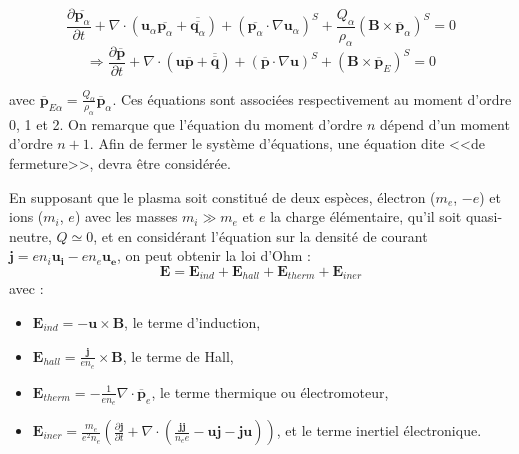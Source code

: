 \begin{equation}
\frac{\partial \overline{\mathbf{p}_{\alpha}}}{\partial t} + \nabla \cdot (\mathbf{u}_{\alpha}\overline{\mathbf{p}_{\alpha}} + \overline{\overline{\mathbf{q}_{\alpha}}}) + (\overline{\mathbf{p}_{\alpha}} \cdot \nabla \mathbf{u}_{\alpha})^S + \frac{Q_{\alpha}}{\rho_{\alpha}} (\mathbf{B}\times \overline{\mathbf{p}}_{\alpha})^S  = 0 \label{eq:model_2} 
\end{equation}
\begin{equation}
\Rightarrow \frac{\partial \overline{\mathbf{p}}}{\partial t} + \nabla \cdot (\mathbf{u}\overline{\mathbf{p}} + \overline{\overline{\mathbf{q}}}) + (\overline{\mathbf{p}} \cdot \nabla \mathbf{u})^S +  (\mathbf{B}\times \overline{\mathbf{p}}_E)^S  = 0 \label{eq:model_2} 
\end{equation}

avec $\overline{\mathbf{p}}_{E\alpha} = \frac{Q_{\alpha}}{\rho_{\alpha}} \overline{\mathbf{p}}_{\alpha}$. Ces équations sont associées respectivement au moment d'ordre 0, 1 et 2. On remarque que l'équation du moment d'ordre $n$ dépend d'un moment d'ordre $n+1$. Afin de fermer le système d'équations, une équation dite <<de fermeture>>, devra être considérée. 

En supposant que le plasma soit constitué de deux espèces, électron ($m_e$, $-e$) et ions ($m_i$, $e$) avec les masses $m_i \gg m_e$ et $e$ la charge élémentaire, qu'il soit quasi-neutre, $Q \simeq 0$, et en considérant l'équation sur la densité de courant $\mathbf{j} = e n_i \mathbf{u_i} - e n_e \mathbf{u_e}$, on peut obtenir la loi d'Ohm : 
\begin{equation} 
\mathbf{E} =  \mathbf{E}_{ind} +  \mathbf{E}_{hall} +  \mathbf{E}_{therm} +  \mathbf{E}_{iner} 
\end{equation}
avec :
\begin{itemize}
 \item $\mathbf{E}_{ind} =  - \mathbf{u} \times \mathbf{B}$, le terme d'induction,
 \item $\mathbf{E}_{hall} = \frac{\mathbf{j}}{e n_e} \times \mathbf{B}$, le terme de Hall,
 \item $\mathbf{E}_{therm} = - \frac{1}{e n_e} \nabla \cdot \overline{\mathbf{p}}_{e}$, le terme thermique ou électromoteur,
 \item $\mathbf{E}_{iner} = \frac{m_e}{e^2n_e} (\frac{\partial \mathbf{j}}{\partial t} + \nabla \cdot ( \frac{\mathbf{jj}}{n_e e} - \mathbf{uj} - \mathbf{ju}) )$, et le terme inertiel électronique.
\end{itemize}


